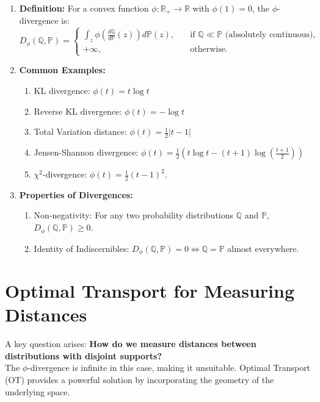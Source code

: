 \documentclass[12pt]{report}
\begin{document}
\begin{enumerate}
    \item \textbf{Definition:} For a convex function $\phi: \mathbb{R}_+ \to \mathbb{R}$ with $\phi(1)=0$, the $\phi$-divergence is:
    \[
        D_{\phi}(\mathbb{Q}, \mathbb{P}) =
        \begin{cases}
            \displaystyle \int_{z} \phi \left(\frac{d\mathbb{Q}}{d\mathbb{P}}(z) \right) d\mathbb{P}(z), & \quad \text{if } \mathbb{Q} \ll \mathbb{P} \text{ (absolutely continuous)}, \\
            +\infty, & \quad \text{otherwise}.
        \end{cases}
    \]
    
    \item \textbf{Common Examples:}
    \begin{enumerate}
        \item KL divergence: $\phi(t) = t \log t$
        \item Reverse KL divergence: $\phi(t) = -\log t$
        \item Total Variation distance: $\phi(t) = \frac{1}{2} |t - 1|$
        \item Jensen-Shannon divergence: $\phi(t) = \frac{1}{2} \left( t \log t - (t+1)\log \left(\frac{t+1}{2}\right) \right)$
        \item $\chi^2$-divergence: $\phi(t) = \frac{1}{2}(t-1)^2$.
    \end{enumerate}
    
    \item \textbf{Properties of Divergences:}
    \begin{enumerate}
        \item Non-negativity: For any two probability distributions $\mathbb{Q}$ and $\mathbb{P}$, $D_\phi(\mathbb{Q}, \mathbb{P}) \ge 0$.
        \item Identity of Indiscernibles: $D_\phi(\mathbb{Q}, \mathbb{P}) = 0 \iff \mathbb{Q} = \mathbb{P}$ almost everywhere.
    \end{enumerate}
\end{enumerate}

\section{Optimal Transport for Measuring Distances}

A key question arises: \textbf{How do we measure distances between distributions with disjoint supports?} \\ The $\phi$-divergence is infinite in this case, making it unsuitable. Optimal Transport (OT) provides a powerful solution by incorporating the geometry of the underlying space.
\end{document}
